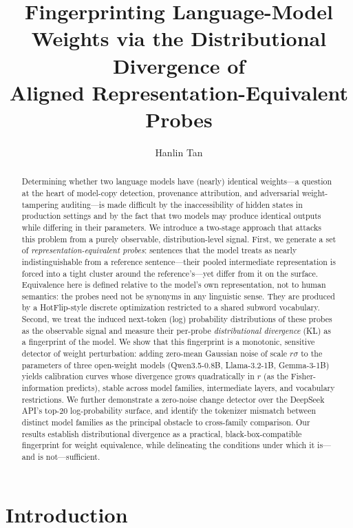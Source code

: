 \documentclass[11pt]{article}
\title{\bf Fingerprinting Language-Model Weights via the Distributional Divergence of\\ Aligned Representation-Equivalent Probes}
\author{Hanlin Tan}
\date{}
\theoremstyle{definition}
\begin{document}
\maketitle

\begin{abstract}
Determining whether two language models have (nearly) identical weights---a
question at the heart of model-copy detection, provenance attribution, and
adversarial weight-tampering auditing---is made difficult by the inaccessibility
of hidden states in production settings and by the fact that two models may
produce identical outputs while differing in their parameters. We introduce a
two-stage approach that attacks this problem from a purely observable,
distribution-level signal. First, we generate a set of
\emph{representation-equivalent probes}: sentences that the model treats as
nearly indistinguishable from a reference sentence---their pooled intermediate
representation is forced into a tight cluster around the reference's---yet
differ from it on the surface. Equivalence here is defined relative to the
model's own representation, not to human semantics: the probes need not be
synonyms in any linguistic sense. They are produced by a HotFlip-style discrete
optimization restricted to a shared subword vocabulary. Second, we treat the induced next-token (log)
probability distributions of these probes as the observable signal and measure
their per-probe \emph{distributional divergence} (KL) as a fingerprint of the
model. We show that this fingerprint is a monotonic, sensitive detector of
weight perturbation: adding zero-mean Gaussian noise of scale $r\sigma$ to the
parameters of three open-weight models (Qwen3.5-0.8B, Llama-3.2-1B,
Gemma-3-1B) yields calibration curves whose divergence grows quadratically in
$r$ (as the Fisher-information predicts), stable across model families,
intermediate layers, and vocabulary restrictions. We further demonstrate a
zero-noise change detector over the
DeepSeek API's top-$20$ log-probability surface, and identify the tokenizer
mismatch between distinct model families as the principal obstacle to
cross-family comparison. Our results establish distributional divergence as a
practical, black-box-compatible fingerprint for weight equivalence, while
delineating the conditions under which it is---and is not---sufficient.
\end{abstract}

\section{Introduction}
\label{sec:intro}
\end{document}
